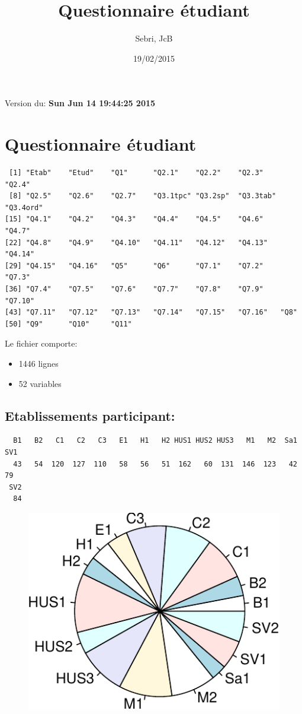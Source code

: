 \documentclass[]{article}
\title{Questionnaire étudiant}
\author{Sebri, JcB}
\date{19/02/2015}
\begin{document}
\maketitle


{
\hypersetup{linkcolor=black}
\setcounter{tocdepth}{2}
\tableofcontents
}
Version du: \textbf{Sun Jun 14 19:44:25 2015}

\section{Questionnaire étudiant}\label{questionnaire-etudiant}

\begin{verbatim}
 [1] "Etab"    "Etud"    "Q1"      "Q2.1"    "Q2.2"    "Q2.3"    "Q2.4"   
 [8] "Q2.5"    "Q2.6"    "Q2.7"    "Q3.1tpc" "Q3.2sp"  "Q3.3tab" "Q3.4ord"
[15] "Q4.1"    "Q4.2"    "Q4.3"    "Q4.4"    "Q4.5"    "Q4.6"    "Q4.7"   
[22] "Q4.8"    "Q4.9"    "Q4.10"   "Q4.11"   "Q4.12"   "Q4.13"   "Q4.14"  
[29] "Q4.15"   "Q4.16"   "Q5"      "Q6"      "Q7.1"    "Q7.2"    "Q7.3"   
[36] "Q7.4"    "Q7.5"    "Q7.6"    "Q7.7"    "Q7.8"    "Q7.9"    "Q7.10"  
[43] "Q7.11"   "Q7.12"   "Q7.13"   "Q7.14"   "Q7.15"   "Q7.16"   "Q8"     
[50] "Q9"      "Q10"     "Q11"    
\end{verbatim}

Le fichier comporte:

\begin{itemize}
\itemsep1pt\parskip0pt
\item
  1446 lignes
\item
  52 variables
\end{itemize}

\subsection{Etablissements
participant:}\label{etablissements-participant}

\begin{verbatim}
  B1   B2   C1   C2   C3   E1   H1   H2 HUS1 HUS2 HUS3   M1   M2  Sa1  SV1 
  43   54  120  127  110   58   56   51  162   60  131  146  123   42   79 
 SV2 
  84 
\end{verbatim}

\begin{figure}[htbp]
\centering
\includegraphics{qs_etudiants_files/figure-latex/participants-1.pdf}
\end{figure}
\end{document}
